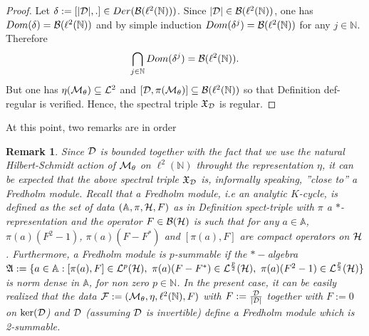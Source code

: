 \documentclass[10pt]{book}
\theoremstyle{break}
\newtheorem{remark}{Remark}
\begin{document}
\begin{proof}
Let $\delta:=[|{\cal{D}}|,.]\in Der({\cal{B}}(\ell^2(\mathbb{N}))) $. Since $|{\cal{D}}|\in{\cal{B}}(\ell^2(\mathbb{N}))$, one has $Dom(\delta)={\cal{B}}(\ell^2(\mathbb{N}))$ and by simple induction $Dom(\delta^j)={\cal{B}}(\ell^2(\mathbb{N}))$ for any $j\in\mathbb{N}$. Therefore
\begin{equation*}
\bigcap_{j\in\mathbb{N}}Dom(\delta^j)={\cal{B}}(\ell^2(\mathbb{N})).
\end{equation*}
But one has $\eta({\cal{M}}_\theta)\subseteq{\cal{L}}^2$ and $[{\cal{D}},\pi({\cal{M}}_\theta)]\subseteq{\cal{B}}(\ell^2(\mathbb{N}))$ so that Definition {def-regular} is verified. Hence, the spectral triple $\mathfrak{X}_{{\cal{D}}}$ is regular.
\end{proof}

\noindent At this point, two remarks are in order

\begin{remark}
Since ${\cal{D}}$ is bounded together with the fact that we use the natural Hilbert-Schmidt action of ${\cal{M}}_\theta$ on $\ell^2(\mathbb{N})$ throught the representation $\eta$, it can be expected that the above spectral triple $\mathfrak{X}_{{\cal{D}}}$ is, informally speaking, ''close to'' a Fredholm module. Recall that a Fredholm module, i.e an analytic $K$-cycle, is defined as the set of data $(\mathbb{A},\pi,{\cal{H}},F)$ as in Definition {spect-triple} with $\pi$ a $*$-representation and the operator $F\in{\cal{B}}({\cal{H}})$ is such that for any $a\in\mathbb{A}$, $\pi(a)(F^2-1)$, $\pi(a)(F-F^*)$ and $[\pi(a),F]$ are compact operators on ${\cal{H}}$. Furthermore, a Fredholm module is $p$-summable if the $*-$algebra $\mathfrak{A}:=\{a\in\mathbb{A}: [\pi(a),F]\in{\cal{L}}^p({\cal{H}}),\ \pi(a)(F-F^*)\in{\cal{L}}^{\frac{p}{2}}({\cal{H}}),\ \pi(a)(F^2-1)\in{\cal{L}}^{\frac{p}{2}}({\cal{H}})\}$ is norm dense in $\mathbb{A}$, for non zero $p\in\mathbb{N}$. In the present case, it can be easily realized that the data ${\cal{F}}:=({\cal{M}}_\theta,\eta,\ell^2(\mathbb{N}), F)$ with $F:=\frac{{\cal{D}}}{|{\cal{D}}|}$ together with $F:=0$ on $\ker({\cal{D}}$) and ${\cal{D}}$ (assuming ${\cal{D}}$ is invertible) define a Fredholm module which is 2-summable.
\end{remark}
\end{document}

